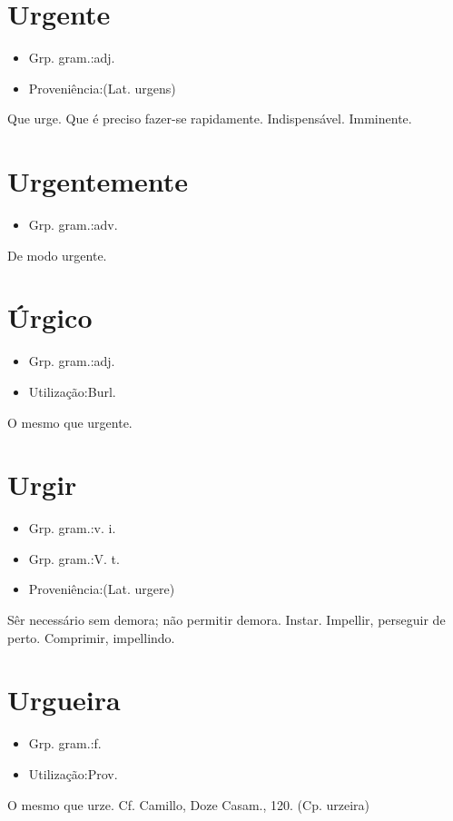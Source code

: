 \documentclass{article}
\begin{document}
\section{Urgente}
\begin{itemize}
\item {Grp. gram.:adj.}
\end{itemize}
\begin{itemize}
\item {Proveniência:(Lat. \textunderscore urgens\textunderscore )}
\end{itemize}
Que urge.
Que é preciso fazer-se rapidamente.
Indispensável.
Imminente.
\section{Urgentemente}
\begin{itemize}
\item {Grp. gram.:adv.}
\end{itemize}
De modo urgente.
\section{Úrgico}
\begin{itemize}
\item {Grp. gram.:adj.}
\end{itemize}
\begin{itemize}
\item {Utilização:Burl.}
\end{itemize}
O mesmo que \textunderscore urgente\textunderscore .
\section{Urgir}
\begin{itemize}
\item {Grp. gram.:v. i.}
\end{itemize}
\begin{itemize}
\item {Grp. gram.:V. t.}
\end{itemize}
\begin{itemize}
\item {Proveniência:(Lat. \textunderscore urgere\textunderscore )}
\end{itemize}
Sêr necessário sem demora; não permitir demora.
Instar.
Impellir, perseguir de perto.
Comprimir, impellindo.
\section{Urgueira}
\begin{itemize}
\item {Grp. gram.:f.}
\end{itemize}
\begin{itemize}
\item {Utilização:Prov.}
\end{itemize}
O mesmo que \textunderscore urze\textunderscore . Cf. Camillo, \textunderscore Doze Casam.\textunderscore , 120.
(Cp. \textunderscore urzeira\textunderscore )
\end{document}
